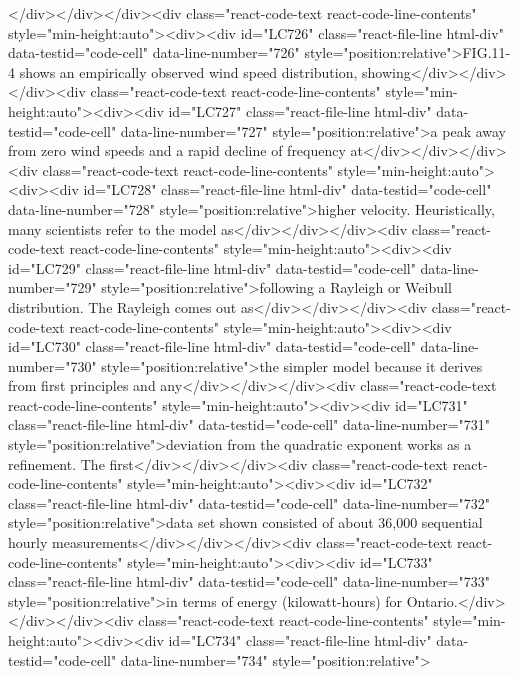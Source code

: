 {{{{{</div></div></div><div class="react-code-text react-code-line-contents" style="min-height:auto"><div><div id="LC726" class="react-file-line html-div" data-testid="code-cell" data-line-number="726" style="position:relative">FIG.11-4 shows an empirically observed wind speed distribution, showing</div></div></div><div class="react-code-text react-code-line-contents" style="min-height:auto"><div><div id="LC727" class="react-file-line html-div" data-testid="code-cell" data-line-number="727" style="position:relative">a peak away from zero wind speeds and a rapid decline of frequency at</div></div></div><div class="react-code-text react-code-line-contents" style="min-height:auto"><div><div id="LC728" class="react-file-line html-div" data-testid="code-cell" data-line-number="728" style="position:relative">higher velocity. Heuristically, many scientists refer to the model as</div></div></div><div class="react-code-text react-code-line-contents" style="min-height:auto"><div><div id="LC729" class="react-file-line html-div" data-testid="code-cell" data-line-number="729" style="position:relative">following a Rayleigh or Weibull distribution. The Rayleigh comes out as</div></div></div><div class="react-code-text react-code-line-contents" style="min-height:auto"><div><div id="LC730" class="react-file-line html-div" data-testid="code-cell" data-line-number="730" style="position:relative">the simpler model because it derives from first principles and any</div></div></div><div class="react-code-text react-code-line-contents" style="min-height:auto"><div><div id="LC731" class="react-file-line html-div" data-testid="code-cell" data-line-number="731" style="position:relative">deviation from the quadratic exponent works as a refinement. The first</div></div></div><div class="react-code-text react-code-line-contents" style="min-height:auto"><div><div id="LC732" class="react-file-line html-div" data-testid="code-cell" data-line-number="732" style="position:relative">data set shown consisted of about 36,000 sequential hourly measurements</div></div></div><div class="react-code-text react-code-line-contents" style="min-height:auto"><div><div id="LC733" class="react-file-line html-div" data-testid="code-cell" data-line-number="733" style="position:relative">in terms of energy (kilowatt-hours) for Ontario.</div></div></div><div class="react-code-text react-code-line-contents" style="min-height:auto"><div><div id="LC734" class="react-file-line html-div" data-testid="code-cell" data-line-number="734" style="position:relative">
}}}}}
